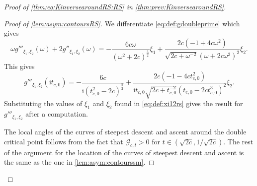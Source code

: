 \documentclass[11pt,twoside]{amsart}
\theoremstyle{plain}
\numberwithin{quest}{section}
\theoremstyle{remark}
\numberwithin{rem}{section}
\theoremstyle{definition}
\begin{document}
\begin{proof}[Proof of \eqref{thm:eq:KinversearoundRS:RS} in \cref{thm:prev:KinversearoundRS}]
\begin{proof}[Proof of \cref{lem:asym:contoursRS}]
			We differentiate \eqref{eq:def:gdoubleprime} which gives
			\begin{equation*}
				\omega g'''_{\xi_1,\xi_2}(\omega)+ 2g''_{\xi_1,\xi_2}(\omega)=-\frac{6c \omega}{(\omega^2+2c)^{\frac{5}{2}}} \xi_1+ \frac{2c(-1+4c\omega^2)}{\sqrt{2c+\omega^{-2}}(\omega+2c \omega^3)^2} \xi_2.
			\end{equation*}
			This gives 
			\begin{equation*}
				g'''_{\xi_1,\xi_2}(\mathrm{i} t_{c,0})=-\frac{6c }{\mathrm{i}(t_{c,0}^2-2c)^{\frac{5}{2}}}+\frac{2c(-1-4ct_{c,0}^2)}{\mathrm{i}t_{c,0}\sqrt{2c+t_{c,0}^{-2}}(t_{c,0}-2c t_{c,0}^3)^2} \xi_2.
			\end{equation*}
			Substituting the values of $\xi_1$ and $\xi_2$ found in \eqref{eq:def:xi12rs} gives the result for $ g'''_{\xi_1,\xi_2}$ after a computation. 
			
			The local angles of the curves of steepest descent and ascent around the double critical point follows from the fact that $\mathcal{G}_{c,t}>0$ for $t \in (\sqrt{2c},1/\sqrt{2c})$.  The rest of the argument for the location of the curves of steepest descent and ascent is the same as the one in \cref{lem:asym:contourssm}. 	
		\end{proof}
		


\end{proof}
\end{document}
